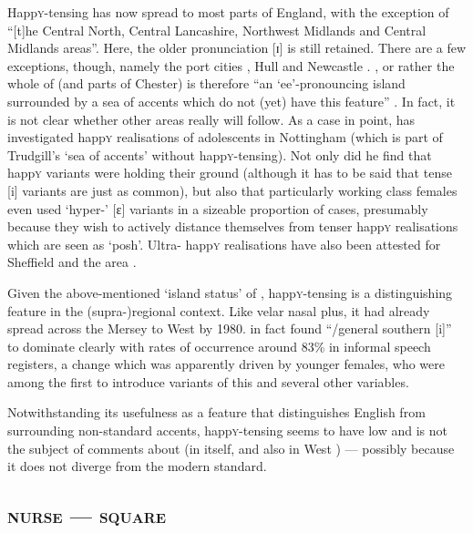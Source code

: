 Happ\textsc{y}-tensing has now spread to most parts of England, with the exception of ``[t]he Central North, Central Lancashire, Northwest Midlands and Central Midlands areas''.
Here, the older pronunciation [ɪ] is still retained.
There are a few exceptions, though, namely the port cities , Hull and Newcastle \citep[cf.][62]{trudgill1999}.
, or rather the whole of  (and parts of Chester) is therefore ``an `ee'-pronouncing island surrounded by a sea of accents which do not (yet) have this feature'' \citep[72]{trudgill1999}.
In fact, it is not clear whether other areas really will follow.
As a case in point, \textcite{flynn2010} has investigated happ\textsc{y} realisations of adolescents in Nottingham (which is part of Trudgill's `sea of accents' without happ\textsc{y}-tensing).
Not only did he find that  happ\textsc{y} variants were holding their ground (although it has to be said that tense [i] variants are just as common), but also that particularly working class females even used `hyper-' [ɛ] variants in a sizeable proportion of cases, presumably because they wish to actively distance themselves from tenser happ\textsc{y} realisations which are seen as `posh'.
Ultra- happ\textsc{y} realisations have also been attested for Sheffield \parencite{stoddartetal1999} and the  area \parencite{watts2006}.

Given the above-mentioned `island status' of , happ\textsc{y}-tensing is a distinguishing feature in the (supra-)regional context.
Like velar nasal plus, it had already spread across the Mersey to West  by 1980.
\textcite[97 and 99]{newbrook1999} in fact found ``/general southern [i]'' to dominate clearly with rates of occurrence around 83\% in informal speech registers, a change which was apparently driven by younger females, who were among the first to introduce  variants of this and several other variables.

Notwithstanding its usefulness as a feature that distinguishes  English from surrounding non-standard accents, happ\textsc{y}-tensing seems to have low  and is not the subject of comments about  (in  itself, and also in West ) --- possibly because it does not diverge from the modern standard.

		\subsection{\textsc{nurse} --- \textsc{square}}\label{sec.var.vow.nurse}

